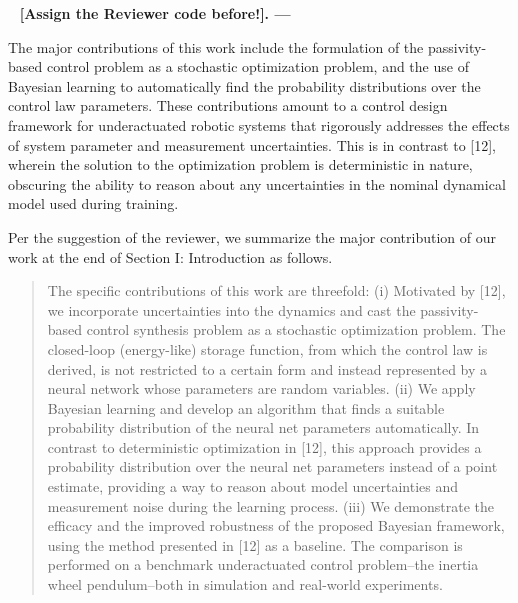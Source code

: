 \documentclass[11pt]{article}
\def \revname {[Assign the Reviewer code before!]}
\newcounter{AR_index}
\newcommand{\answer}{~\newline {\Huge\color{Gray} A.} \textbf{{\Large \revname.\arabic{AR_index}} \hspace{1mm}\----\hspace{1mm}}}
\begin{document}
\answer{
    The major contributions of this work include the formulation of the
    passivity-based control problem as a stochastic optimization problem, and
    the use of Bayesian learning to automatically find the probability
    distributions over the control law parameters.
    These contributions amount to a control design framework for underactuated
    robotic systems that rigorously addresses the effects of system parameter
    and measurement uncertainties. 
    This is in contrast to [12], wherein the solution
    to the optimization problem is deterministic in nature, obscuring the
    ability to reason about any uncertainties in the nominal dynamical model
    used during training.
    
    Per the suggestion of the reviewer, we summarize the major contribution of
    our work at the end of Section I: Introduction as follows.


    \begin{quote}
        \color{magenta} 
        
        The specific contributions of this work are threefold: (i) Motivated
        by [12], we incorporate uncertainties into the
        dynamics and cast the passivity-based control synthesis problem as a
        stochastic optimization problem.
        The closed-loop (energy-like) storage function, from which the control
        law is derived, is not restricted to a certain form and instead
        represented by a neural network whose parameters are random variables.
        (ii) We apply Bayesian learning and develop an algorithm that finds a
        suitable probability distribution of the neural net parameters
        automatically.
        In contrast to deterministic optimization
        in [12], this approach provides a probability
        distribution over the neural net parameters instead of a point estimate,
        providing a way to reason about model uncertainties and measurement
        noise during the learning process.
        (iii) We demonstrate the efficacy and the improved robustness of the
        proposed Bayesian framework, using the method presented
        in [12] as a baseline. The comparison is
        performed on a benchmark underactuated control problem--the inertia
        wheel pendulum--both in simulation and real-world experiments. 
    \end{quote}



}
\end{document}
